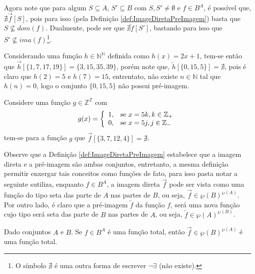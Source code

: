 Agora note que para algum $S \subseteq A$, $S' \subseteq B$ com $S, S' \neq \emptyset$ e $f \in B^A$, é possível que, $\nexists\overrightarrow{f}[S]$, pois para isso (pela Definição \ref{def:ImageDiretaPreImagem}) basta que $S \not\subseteq dom(f)$. Dualmente, pode ser que $\nexists\overleftarrow{f}[S']$, bastando para isso que $S' \not\subseteq ima(f)$\footnote{O símbolo $\nexists$ é uma outra forma de escrever $\neg\exists$ (não existe).}.

\begin{exemplo}\label{exe:ImagemDiretaPreImagem3}
  Considerando uma função $h \in \mathbb{N}^\mathbb{N}$ definida como $h(x)= 2x + 1$, tem-se então que $\overrightarrow{h}[\{1, 7, 17, 19\}] = \{3, 15, 35, 39\}$, porém note que,  $\overleftarrow{h}[\{0, 15, 5\}] = \nexists$, pois é claro que $h(2) = 5$ e $h(7) = 15$, entrentato, não existe $n \in \mathbb{N}$ tal que $h(n) = 0$, logo o conjunto $\{0, 15, 5\}$ não possui pré-imagem.
\end{exemplo}

\begin{exemplo}\label{exe:ImagemDiretaPreImagem4}
  Considere uma função $g \in \mathbb{Z}^\mathbb{Z}$ com 
  $$g(x) = \left\{\begin{array}{ll}	1, & \hbox{se } x = 5k, k \in \mathbb{Z}_+\\0,  & \hbox{se } x = 5j, j \in \mathbb{Z}_{-} \end{array}\right.$$
  tem-se para a função $g$ que $\overrightarrow{f}[\{3, 7, 12, 4\}] = \nexists$.
\end{exemplo}

Observe que a Definição \ref{def:ImageDiretaPreImagem} estabelece que a imagem direta e a pré-imagem são ambas conjuntos, entretanto, a mesma definição permitir enxergar tais conceitos como funções de fato, para isso pasta notar a seguinte sutiliza, enquanto $f \in B^A$, a imagem direta $\overrightarrow{f}$ pode ser vista como uma função do tipo seta das parte de $A$ nas partes de $B$, ou seja, $\overrightarrow{f} \in \wp(B)^{\wp(A)}$. Por outro lado, é claro que a pré-imagem $\overleftarrow{f}$ da função $f$, será uma nova função cujo tipo será seta das parte de $B$ nas partes de $A$, ou seja, $\overleftarrow{f} \in \wp(A)^{\wp(B)}$.

\begin{proposicao}
  Dado conjuntos $A$ e $B$. Se $f \in B^A$ é uma função total, então $\overrightarrow{f} \in \wp(B)^{\wp(A)}$ é uma função total.
\end{proposicao}

